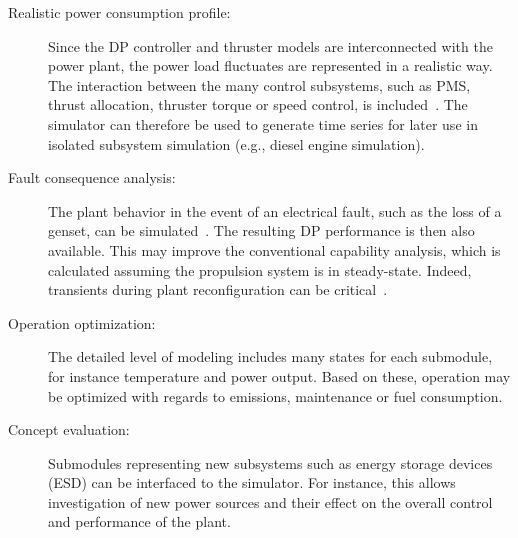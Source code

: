 \documentclass[journal]{IEEEtran}
\begin{document}
\begin{description}

\item[Realistic power consumption profile:]Since the DP controller and thruster models are interconnected with the power plant, the power load fluctuates are represented in a realistic way. 
The interaction between the many control subsystems, such as PMS, thrust allocation, thruster torque or speed control, is included~\cite{Bo2013}.
The simulator can therefore be used to generate time series for later use in isolated subsystem simulation (e.g., diesel engine simulation). 

\item[Fault consequence analysis:]
The plant behavior in the event of an electrical fault, such as the loss of a genset, can be simulated~\cite{Bo2013b}. The resulting DP performance is then also available. This may improve the conventional capability analysis, which is calculated assuming the propulsion system is in steady-state. Indeed, transients during plant reconfiguration can be critical~\cite{Pivano2014}.

\item[Operation optimization:]
The detailed level of modeling includes many states for each submodule, for instance temperature and power output. Based on these, operation may be optimized with regards to emissions, maintenance or fuel consumption.

\item[Concept evaluation:]
Submodules representing new subsystems such as energy storage devices (ESD) can be interfaced to the simulator. For instance, this allows investigation of new power sources and their effect on the overall control and performance of the plant.


\end{description}
\end{document}
